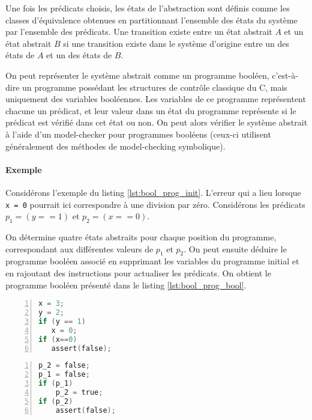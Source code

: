 Une fois les prédicats choisis, les états de l'abstraction sont définis comme
les classes d'équivalence obtenues en partitionnant l'ensemble des états du
système par l'ensemble des prédicats. Une transition existe entre un état
abstrait \(A\) et un état abstrait \(B\) si une transition existe dans le
système d'origine entre un des états de \(A\) et un des états de \(B\).

On peut représenter le système abstrait comme un programme booléen, c'est-à-dire
un programme possédant les structures de contrôle classique du C, mais
uniquement des variables booléennes. Les variables de ce programme représentent
chacune un prédicat, et leur valeur dans un état du programme représente si
le prédicat est vérifié dans cet état ou non. On peut alors vérifier le système
abstrait à l'aide d'un model-checker pour programmes booléens (ceux-ci utilisent
généralement des méthodes de model-checking symbolique).

\paragraph{Exemple}

Considérons l'exemple du listing \ref{lst:bool_prog_init}. L'erreur qui a lieu
lorsque \texttt{x = 0} pourrait ici correspondre à une division par
zéro. Considérons les prédicats \(p_1 = (y == 1)\) et \(p_2 = (x == 0)\).

On détermine quatre états abstraits pour chaque position du programme,
correspondant aux différentes valeurs de \(p_1\) et \(p_2\). On peut ensuite
déduire le programme booléen associé en supprimant les variables du programme
initial et en rajoutant des instructions pour actualiser les prédicats. On
obtient le programme booléen présenté dans le listing \ref{lst:bool_prog_bool}.

\noindent\begin{minipage}{.45\textwidth}
\begin{lstlisting}[language=C, caption=Code initial, frame=single, numbers=left,
    label=lst:bool_prog_init]
x = 3;
y = 2;
if (y == 1)
   x = 0;
if (x==0)
   assert(false);
\end{lstlisting}
\end{minipage}\hfill
\begin{minipage}{.45\textwidth}
\begin{lstlisting}[language=C, caption=Programme booléen,frame=single, numbers=left,
    label=lst:bool_prog_bool]
p_2 = false;
p_1 = false;
if (p_1)
    p_2 = true;
if (p_2)
    assert(false);
\end{lstlisting}
\end{minipage}

